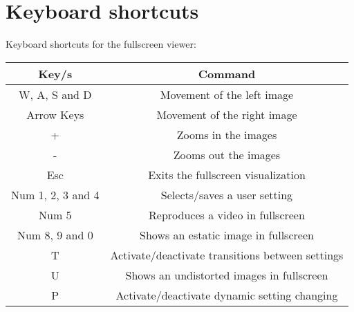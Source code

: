 \documentclass[]{article}
\title{}
\author{}
\begin{document}
\section*{Keyboard shortcuts}
Keyboard shortcuts for the fullscreen viewer:
\def\arraystretch{1.5}

	\begin{table}[!h]
	\begin{center}
		\begin{tabular}{|c|c|}
			\hline 
			Key/s & Command \\ 
			\hline 
			\hline 
			W, A, S and D & Movement of the left image \\ 
			\hline 
			Arrow Keys & Movement of the right image   \\ 
			\hline 
			+ & Zooms in the images \\ 
			\hline 
			- & Zooms out the images \\ 
			\hline 
			Esc & Exits the fullscreen visualization \\ 
			\hline 
			Num 1, 2, 3 and 4 & Selects/saves a user setting \\ 
			\hline 
			Num 5 & Reproduces a video in fullscreen \\ 
			\hline 
			Num 8, 9 and 0 & Shows an estatic image in fullscreen \\ 
			\hline 
			T & Activate/deactivate transitions between settings \\ 
			\hline 
			U & Shows an undistorted images in fullscreen  \\ 
			\hline 
			P & Activate/deactivate dynamic setting changing \\ 
			\hline 
		\end{tabular} 
	\end{center}
\end{table}
\end{document}
